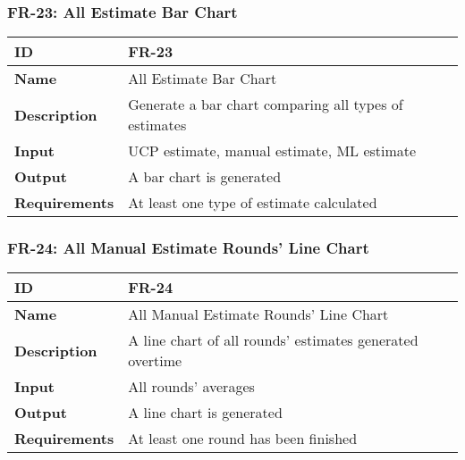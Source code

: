     

    \subsubsection{FR-23: All Estimate Bar Chart}
    \begin{center}
        \begin{tabularx}{\textwidth}{|l|X|}
            \hline
            \textbf{ID} & FR-23 \\
            \hline
            \textbf{Name} & All Estimate Bar Chart \\
            \hline
            \textbf{Description} & Generate a bar chart comparing all types of estimates \\
            \hline
            \textbf{Input} & UCP estimate, manual estimate, ML estimate \\
            \hline
            \textbf{Output} & A bar chart is generated \\
            \hline
            \textbf{Requirements} & At least one type of estimate calculated \\
            \hline
        \end{tabularx}
    \end{center}
    
    

    \subsubsection{FR-24: All Manual Estimate Rounds' Line Chart}
    \begin{center}
        \begin{tabularx}{\textwidth}{|l|X|}
            \hline
            \textbf{ID} & FR-24 \\
            \hline
            \textbf{Name} & All Manual Estimate Rounds' Line Chart \\
            \hline
            \textbf{Description} & A line chart of all rounds' estimates generated overtime \\
            \hline
            \textbf{Input} & All rounds' averages \\
            \hline
            \textbf{Output} & A line chart is generated \\
            \hline
            \textbf{Requirements} & At least one round has been finished \\
            \hline
        \end{tabularx}
    \end{center}
    \newpage
    

